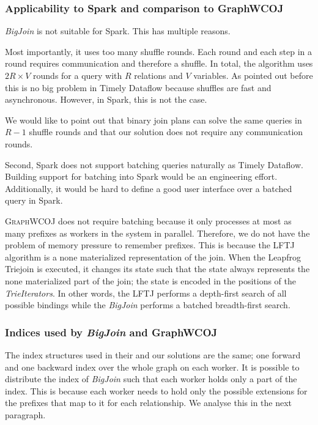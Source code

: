 \subsubsection{Applicability to Spark and comparison to GraphWCOJ}
\textit{BigJoin} is not suitable for Spark.
This has multiple reasons.

Most importantly, it uses too many shuffle rounds.
Each round and each step in a round requires communication and therefore a shuffle.
In total, the algorithm uses $2R \times V$ rounds for a query with $R$ relations and $V$ variables.
As pointed out before this is no big problem in Timely Dataflow because shuffles are fast and asynchronous.
However, in Spark, this is not the case.

We would like to point out that binary join plans can solve the same queries in $R - 1$ shuffle rounds and
that our solution does not require any communication rounds.

Second, Spark does not support batching queries naturally as Timely Dataflow.
Building support for batching into Spark would be an engineering effort.
Additionally, it would be hard to define a good user interface over a batched query in Spark.

\textsc{GraphWCOJ} does not require batching because it only processes at most as many prefixes as workers in the system in parallel.
Therefore, we do not have the problem of memory pressure to remember prefixes.
This is because the \textsc{LFTJ} algorithm is a none materialized representation of the join.
When the Leapfrog Triejoin is executed, it changes its state such that the state always represents the none materialized
part of the join;
the state is encoded in the positions of the \textit{TrieIterators}.
In other words, the \textsc{LFTJ} performs a depth-first search of all possible bindings while the \textit{BigJoin}
performs a batched breadth-first search.

\subsubsection{Indices used by \textit{BigJoin} and GraphWCOJ}
The index structures used in their and our solutions are the same; one forward and one backward index over the whole graph on each
worker.
It is possible to distribute the index of \textit{BigJoin} such that each worker holds only a part
of the index.
This is because each worker needs to hold only the possible extensions for the prefixes that map to it for each relationship.
We analyse this in the next paragraph.

